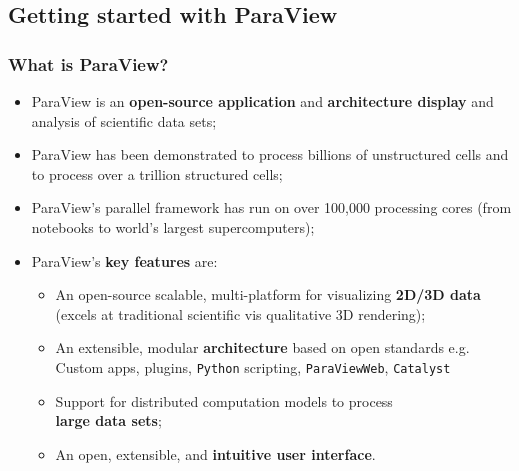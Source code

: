 \documentclass[]{beamer}
\begin{document}
\subsection{Getting started with ParaView} %


\begin{frame}
    \frametitle{What is ParaView?}
        \begin{itemize}
            \item ParaView is an \textbf{open-source application} and \textbf{architecture display} and analysis of scientific data sets;
            \item ParaView has been demonstrated to process billions of unstructured cells and to process over a trillion structured cells; 
            \item ParaView's parallel framework has run on over 100,000 processing cores {\tiny (from notebooks to world's largest supercomputers)};
            \item ParaView's \textbf{key features} are:
            \begin{itemize}
                \item An open-source scalable, multi-platform for visualizing \textbf{2D/3D data} {\tiny (excels at traditional scientific vis qualitative 3D rendering)};
                \item An extensible, modular \textbf{architecture} based on open standards {\tiny e.g. Custom apps, plugins, \texttt{Python} scripting, \texttt{ParaViewWeb}, \texttt{Catalyst}} 
                \item Support for distributed computation models to process \\ \textbf{large data sets}; 
                \item An open, extensible, and \textbf{intuitive user interface}.
            \end{itemize}
        \end{itemize}
\end{frame}
\end{document}
